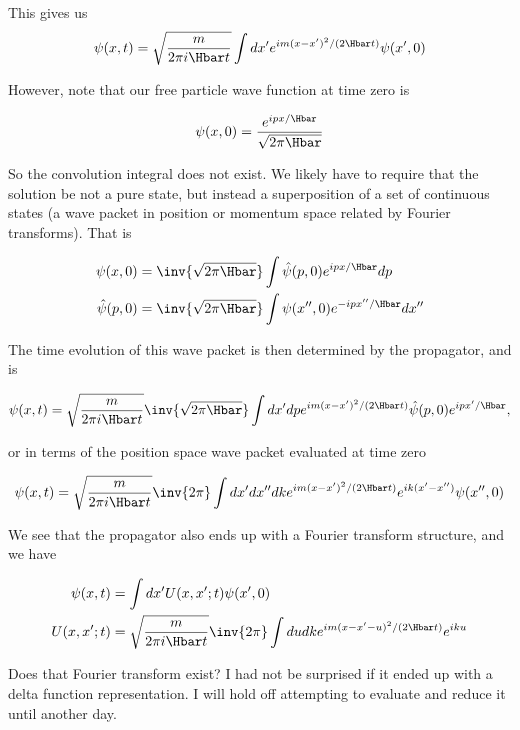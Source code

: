 {This gives us
\begin{equation}\label{eqn:qmIexamPractice2007Dec:1f:40}
\psi(x, t)
=
\sqrt{\frac{m}{2 \pi i \Hbar t}} 
\int dx' 
e^{i m (x-x')^2/ (2 \Hbar t)} \psi(x', 0)
\end{equation}

However, note that our free particle wave function at time zero is

\begin{equation}\label{eqn:qmIexamPractice2007Dec:1f:50}
\psi(x, 0) = \frac{e^{i p x/\Hbar}}{\sqrt{2 \pi \Hbar}}
\end{equation}

So the convolution integral  does not exist.  We likely have to require that the solution be not a pure state, but instead a superposition of a set of continuous states (a wave packet in position or momentum space related by Fourier transforms).  That is

\begin{equation}\label{eqn:qmIexamPractice2007Dec:1f:60}
\begin{aligned}
\psi(x, 0) &= 
\inv{\sqrt{2 \pi \Hbar}} \int \hat{\psi}(p, 0) e^{i p x/\Hbar} dp \\
\hat{\psi}(p, 0) &= 
\inv{\sqrt{2 \pi \Hbar}} \int \psi(x'', 0) e^{-i p x''/\Hbar} dx''
\end{aligned}
\end{equation}

The time evolution of this wave packet is then determined by the propagator, and is

\begin{equation}\label{eqn:qmIexamPractice2007Dec:1f:70}
\psi(x,t) =
\sqrt{\frac{m}{2 \pi i \Hbar t}} 
\inv{\sqrt{2 \pi \Hbar}} 
\int dx' dp
e^{i m (x-x')^2/ (2 \Hbar t)}
\hat{\psi}(p, 0) e^{i p x'/\Hbar} ,
\end{equation}

or in terms of the position space wave packet evaluated at time zero

\begin{equation}\label{eqn:qmIexamPractice2007Dec:1f:80}
\psi(x,t) =
\sqrt{\frac{m}{2 \pi i \Hbar t}}
\inv{2 \pi}
\int dx' dx'' dk
e^{i m (x-x')^2/ (2 \Hbar t)}
e^{i k (x' - x'')} \psi(x'', 0)
\end{equation}

We see that the propagator also ends up with a Fourier transform structure, and we have

\begin{equation}\label{eqn:qmIexamPractice2007Dec:1f:90}
\begin{aligned}
\psi(x,t) &= \int dx' U(x, x' ; t) \psi(x', 0) \\
U(x, x' ; t) &=
\sqrt{\frac{m}{2 \pi i \Hbar t}}
\inv{2 \pi}
\int du dk
e^{i m (x - x' - u)^2/ (2 \Hbar t)}
e^{i k u }
\end{aligned}
\end{equation}

Does that Fourier transform exist?  I had not be surprised if it ended up with a delta function representation.  I will hold off attempting to evaluate and reduce it until another day.

} %

